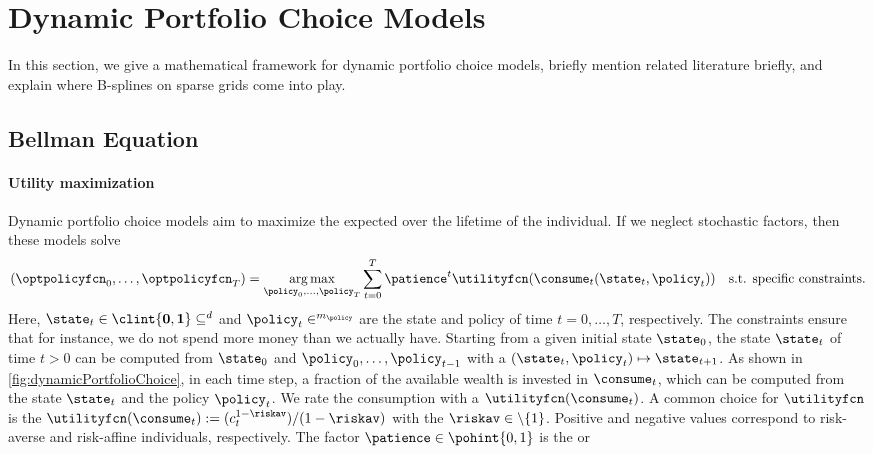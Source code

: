 \section{Dynamic Portfolio Choice Models}
\label{sec:81models}

In this section, we give a mathematical framework for
dynamic portfolio choice models,
briefly mention related literature briefly, and
explain where B-splines on sparse grids come into play.



\subsection{Bellman Equation}
\label{sec:811bellmanEquation}

\paragraph{Utility maximization}

Dynamic portfolio choice models aim to maximize the expected
 over the lifetime of the individual.
If we neglect stochastic factors, then these models solve
\begin{equation}
  \label{eq:utilityMaximization}
  (\optpolicyfcn_0, \dotsc, \optpolicyfcn_T)
  = \argmax_{\policy_0, \dotsc, \policy_T}
  \sum_{t=0}^T \patience^t \utilityfcn(\consume_t(\state_t, \policy_t))
  \quad\text{s.t. specific constraints.}
\end{equation}
Here, $\state_t \in \clint{\*0, \*1} \subset \real^d$ and
$\policy_t \in \real^{m_{\policy}}$
are the state and policy of time $t = 0, \dotsc, T$, respectively.
The constraints ensure that for instance, we do not spend more money
than we actually have.
Starting from a given initial state $\state_0$,
the state $\state_t$ of time $t > 0$ can be computed from
$\state_0$ and $\policy_0, \dotsc, \policy_{t-1}$ with a
 $(\state_t, \policy_t) \mapsto \state_{t+1}$.
As shown in \cref{fig:dynamicPortfolioChoice},
in each time step, a fraction of the available wealth
is invested in  $\consume_t$,
which can be computed from the state $\state_t$ and the policy $\policy_t$.
We rate the consumption with a 
$\utilityfcn(\consume_t)$.
A common choice for $\utilityfcn$ is the
$\utilityfcn(\consume_t) := (c_t^{1-\riskav})/(1-\riskav)$
with the  $\riskav \in \real \setminus \{1\}$.
Positive and negative values correspond to risk-averse and risk-affine
individuals, respectively.
The factor $\patience \in \pohint{0, 1}$ is the 
or 

